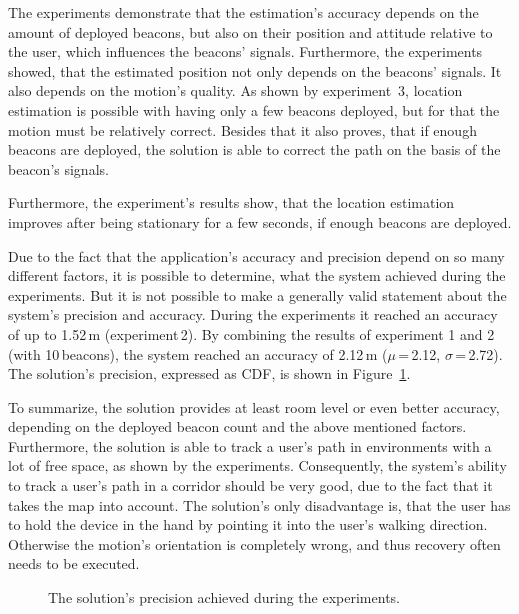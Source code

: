 The experiments demonstrate that the estimation's accuracy depends on the amount of deployed beacons, but also on their position and attitude relative to the user, which influences the beacons' signals. Furthermore, the experiments showed, that the estimated position not only depends on the beacons' signals. It also depends on the motion's quality. As shown by experiment~3, location estimation is possible with having only a few beacons deployed, but for that the motion must be relatively correct. Besides that it also proves, that if enough beacons are deployed, the solution is able to correct the path on the basis of the beacon's signals.

Furthermore, the experiment's results show, that the location estimation improves after being stationary for a few seconds, if enough beacons are deployed.

Due to the fact that the application's accuracy and precision depend on so many different factors, it is possible to determine, what the system achieved during the experiments. But it is not possible to make a generally valid statement about the system's precision and accuracy. During the experiments it reached an accuracy of up to 1.52\,m (experiment\,2). By combining the results of experiment 1 and 2 (with 10\,beacons), the system reached an accuracy of 2.12\,m ($\mu$\,=\,2.12, $\sigma$\,=\,2.72). The solution's precision, expressed as \ac{CDF}, is shown in Figure~\ref{fig:eval:precision}.

To summarize, the solution provides at least room level or even better accuracy, depending on the deployed beacon count and the above mentioned factors. Furthermore, the solution is able to track a user's path in environments with a lot of free space, as shown by the experiments. Consequently, the system's ability to track a user's path in a corridor should be very good, due to the fact that it takes  the map into account. The solution's only disadvantage is, that the user has to hold the device in the hand by pointing it into the user's walking direction. Otherwise the motion's orientation is completely wrong, and thus recovery often needs to be executed.


\begin{figure}
	
	\caption{The solution's precision achieved during the experiments.}
	\label{fig:eval:precision}
\end{figure}


